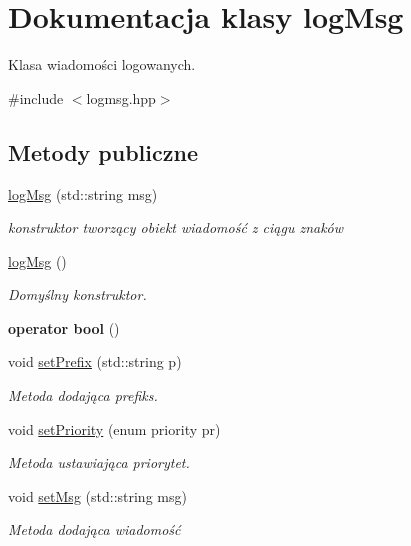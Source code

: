 \hypertarget{classlog_msg}{}\section{Dokumentacja klasy log\+Msg}
\label{classlog_msg}


Klasa wiadomości logowanych.  




{\ttfamily \#include $<$logmsg.\+hpp$>$}

\subsection*{Metody publiczne}
\begin{DoxyCompactItemize}
\item 
\hyperlink{classlog_msg_a59a223eea638eb82439786fa0b21ae99}{log\+Msg} (std\+::string msg)
\begin{DoxyCompactList}\small\item\em konstruktor tworzący obiekt wiadomość z ciągu znaków \end{DoxyCompactList}\item 
\hyperlink{classlog_msg_a7a9c2ceecce658a2d89c17e54f50627e}{log\+Msg} ()
\begin{DoxyCompactList}\small\item\em Domyślny konstruktor. \end{DoxyCompactList}\item 
\mbox{\label{classlog_msg_ab063639ca2a1877132b4361c18c7f11b}} 
{\bfseries operator bool} ()
\item 
void \hyperlink{classlog_msg_a11cdf7b82dc82b369a5d62b721b27e46}{set\+Prefix} (std\+::string p)
\begin{DoxyCompactList}\small\item\em Metoda dodająca prefiks. \end{DoxyCompactList}\item 
void \hyperlink{classlog_msg_a5877fcab52fdf21e293997e32219724f}{set\+Priority} (enum priority pr)
\begin{DoxyCompactList}\small\item\em Metoda ustawiająca priorytet. \end{DoxyCompactList}\item 
void \hyperlink{classlog_msg_a329a01a7f2b71cd3adbc0aa637169a65}{set\+Msg} (std\+::string msg)
\begin{DoxyCompactList}\small\item\em Metoda dodająca wiadomość \end{DoxyCompactList}\item 

\end{DoxyCompactItemize}
